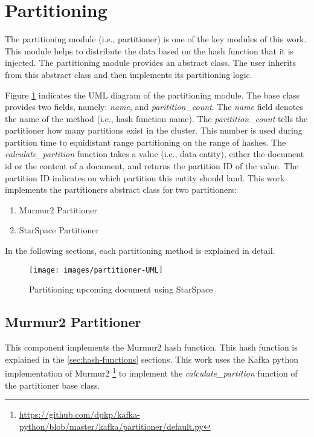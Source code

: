 \section{Partitioning}
\label{sec:partitioning}
The partitioning module (i.e., partitioner) is one of the key modules of this work. This module helps to distribute the data based on the hash function that it is injected. The partitioning module provides an abstract class. The user inherits from this abstract class and then implements its partitioning logic. 


Figure \ref{fig:partitioner-uml} indicates the UML diagram of the partitioning module. The base class provides two fields, namely: \emph{name}, and \emph{paritition\_count}. The \emph{name} field denotes the name of the method (i.e., hash function name). The \emph{paritition\_count} tells the partitioner how many partitions exist in the cluster. This number is used during partition time to equidistant range partitioning on the range of hashes. The \emph{calculate\_partition} function takes a value (i.e., data entity), either the document id or the content of a document, and returns the partition ID of the value. The partition ID indicates on which partition this entity should land. This work implements the partitioners abstract class for two partitioners:

\begin{enumerate}
    \item Murmur2 Partitioner
    \item StarSpace Partitioner
\end{enumerate}

In the following sections, each partitioning method is explained in detail.

\begin{figure}[!h]
    \centering
    \texttt{[image: images/partitioner-UML]}
    \caption{Partitioning upcoming document using StarSpace}
    \label{fig:partitioner-uml}
\end{figure}


\subsection{Murmur2 Partitioner}
\label{subsec:partitioning-murmur2}
This component implements the Murmur2 hash function. This hash function is explained in the \ref{sec:hash-functions} sections. This work uses the Kafka python implementation of Murmur2 \footnote{\url{https://github.com/dpkp/kafka-python/blob/master/kafka/partitioner/default.py}} to implement the \emph{calculate\_partition} function of the partitioner base class.

